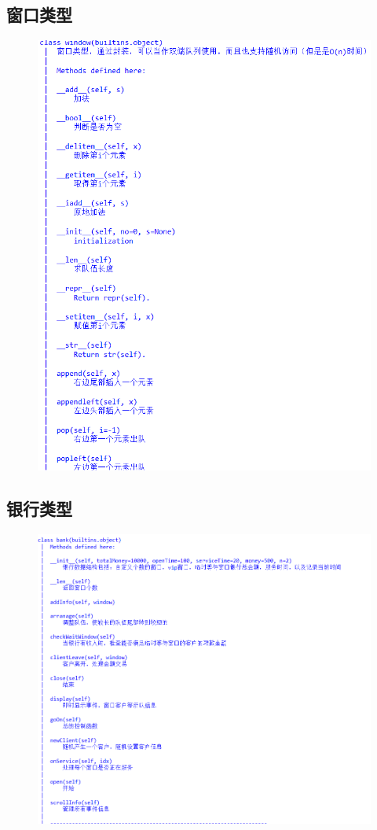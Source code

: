 \documentclass[UTF8]{ctexart}
\begin{document}
\subsection{窗口类型}
\begin{figure}[H]
  \centering
  \includegraphics[width=1\textwidth]{window.png}
\end{figure}
\subsection{银行类型}
\begin{figure}[H]
  \centering
  \includegraphics[width=1\textwidth]{bank.png}
\end{figure}
\end{document}
